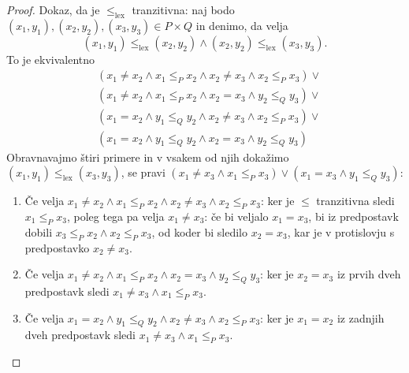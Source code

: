 \begin{proof}
  Dokaz, da je $\leq_\mathrm{lex}$ tranzitivna: naj bodo $(x_1,y_1), (x_2,y_2), (x_3, y_3) \in P \times Q$ in denimo, da velja
  \begin{equation*}
    (x_1, y_1) \leq_\mathrm{lex} (x_2, y_2) \land (x_2, y_2) \leq_\mathrm{lex} (x_3, y_3).
  \end{equation*}
  To je ekvivalentno
  \begin{align*}
  & (x_1 \neq x_2 \land x_1 \leq_P x_2 \land x_2 \neq x_3 \land x_2 \leq_P x_3) \lor  {} \\
  & (x_1 \neq x_2 \land x_1 \leq_P x_2 \land x_2 = x_3 \land y_2 \leq_Q y_3) \lor {} \\
  & (x_1 = x_2 \land y_1 \leq_Q y_2 \land x_2 \neq x_3 \land x_2 \leq_P x_3) \lor {} \\
  & (x_1 = x_2 \land y_1 \leq_Q y_2 \land x_2 = x_3 \land y_2 \leq_Q y_3)
  \end{align*}
  Obravnavajmo štiri primere in v vsakem od njih dokažimo $(x_1, y_1) \leq_\mathrm{lex} (x_3, y_3)$, se pravi
  $(x_1 \neq x_3 \land x_1 \leq_P x_3) \lor (x_1 = x_3 \land y_1 \leq_Q y_3)$:
  \begin{enumerate}
  \item Če velja $x_1 \neq x_2 \land x_1 \leq_P x_2 \land x_2 \neq x_3 \land x_2 \leq_P x_3$: ker je $\leq$ tranzitivna sledi $x_1 \leq_P x_3$, poleg tega pa velja $x_1 \neq
    x_3$: če bi veljalo $x_1 = x_3$, bi iz predpostavk dobili $x_3 \leq_P x_2 \land x_2 \leq_P x_3$, od koder bi sledilo $x_2 = x_3$, kar je v
    protislovju s predpostavko $x_2 \neq x_3$.

  \item Če velja $x_1 \neq x_2 \land x_1 \leq_P x_2 \land x_2 = x_3 \land y_2 \leq_Q y_3$: ker je $x_2 = x_3$ iz prvih dveh predpostavk sledi $x_1 \neq x_3 \land x_1 \leq_P x_3$.

  \item Če velja $x_1 = x_2 \land y_1 \leq_Q y_2 \land x_2 \neq x_3 \land x_2 \leq_P x_3$: ker je $x_1 = x_2$ iz zadnjih dveh predpostavk sledi $x_1 \neq x_3 \land x_1 \leq_P x_3$.


\end{enumerate}
\end{proof}
